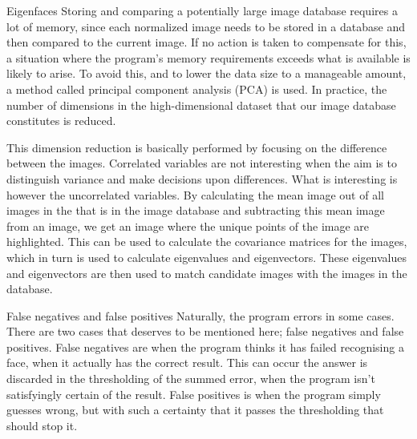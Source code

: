Eigenfaces
Storing and comparing a potentially large image database requires a lot of memory, since each normalized image needs to be stored in a database and then compared to the current image. If no action is taken to compensate for this, a situation where the program’s memory requirements exceeds what is available is likely to arise. To avoid this, and to lower the data size to a manageable amount, a method called principal component analysis (PCA) is used. In practice, the number of dimensions in the high-dimensional dataset that our image database constitutes is reduced.

This dimension reduction is basically performed by focusing on the difference between the images. Correlated variables are not interesting when the aim is to distinguish variance and make decisions upon differences. What is interesting is however the uncorrelated variables. By calculating the mean image out of all images in the that is in the image database and subtracting this mean image from an image, we get an image where the unique points of the image are highlighted. This can be used to calculate the covariance matrices for the images, which in turn is used to calculate eigenvalues and eigenvectors. These eigenvalues and eigenvectors are then used to match candidate images with the images in the database.

False negatives and false positives
Naturally, the program errors in some cases. There are two cases that deserves to be mentioned here; false negatives and false positives. False negatives are when the program thinks it has failed recognising a face, when it actually has the correct result. This can occur the answer is discarded in the thresholding of the summed error, when the program isn’t satisfyingly certain of the result. False positives is when the program simply guesses wrong, but with such a certainty that it passes the thresholding that should stop it.
